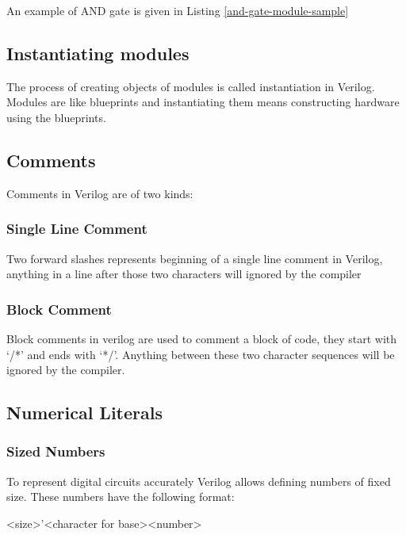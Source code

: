 \documentclass[a4paper,10pt]{article}
\theoremstyle{mytheor}
\newcommand{
  \insertverilog}[3]{
  
}
\begin{document}
\break
\insertverilog{./verilog_files/module.v}{sample-module-bare}{\text{Sample
    module indicating its structure}}

An example of AND gate is given in Listing
\ref{and-gate-module-sample}
\insertverilog{./verilog_files/andGate.v}{and-gate-module-sample}{\text{Illustrative
    AND gate module}}

\subsection*{Instantiating modules}
The process of creating objects of modules is called instantiation in
Verilog. Modules are like blueprints and instantiating them means
constructing hardware using the blueprints.

\break
\insertverilog{./verilog_files/AndGate3.v}{sample-module}{\text{Illustrative
    AND gate module}}
\subsection*{Comments}
Comments in Verilog are of two kinds:
\subsubsection*{Single Line Comment}
Two forward slashes represents beginning of a single line comment in
Verilog, anything in a line after those two characters will ignored by
the compiler
\insertverilog{./verilog_files/singleLineComment.v}{single-line-comment}{\text{Single
    line comment}}

\subsubsection*{Block Comment}
Block comments in verilog are used to comment a block of code, they
start with `/*' and ends with `*/'. Anything between these two
character sequences will be ignored by the compiler.
\insertverilog{./verilog_files/blockComment.v}{block-comment}{\text{Block
    comment}}

\subsection*{Numerical Literals}
\subsubsection*{Sized Numbers}
To represent digital circuits accurately Verilog allows defining
numbers of fixed size. These numbers have the following format:
\begin{center}
  <size>'<character for base><number>
\end{center}
\end{document}
